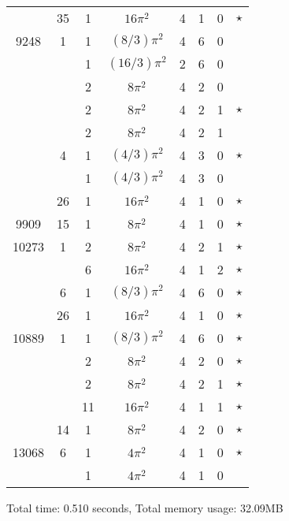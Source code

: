 \begin{tabular}{ccc|ccccc}
 & 35 & 1 & $16\pi^2$ & 4 & 1 & 0 & $\star$ \\
9248 & 1 & 1 & $(8/3)\pi^2$ & 4 & 6 & 0 &  \\
 &  & 1 & $(16/3)\pi^2$ & 2 & 6 & 0 &  \\
 &  & 2 & $8\pi^2$ & 4 & 2 & 0 &  \\
 &  & 2 & $8\pi^2$ & 4 & 2 & 1 & $\star$ \\
 &  & 2 & $8\pi^2$ & 4 & 2 & 1 &  \\
 & 4 & 1 & $(4/3)\pi^2$ & 4 & 3 & 0 & $\star$ \\
 &  & 1 & $(4/3)\pi^2$ & 4 & 3 & 0 &  \\
 & 26 & 1 & $16\pi^2$ & 4 & 1 & 0 & $\star$ \\
9909 & 15 & 1 & $8\pi^2$ & 4 & 1 & 0 & $\star$ \\
10273 & 1 & 2 & $8\pi^2$ & 4 & 2 & 1 & $\star$ \\
 &  & 6 & $16\pi^2$ & 4 & 1 & 2 & $\star$ \\
 & 6 & 1 & $(8/3)\pi^2$ & 4 & 6 & 0 & $\star$ \\
 & 26 & 1 & $16\pi^2$ & 4 & 1 & 0 & $\star$ \\
10889 & 1 & 1 & $(8/3)\pi^2$ & 4 & 6 & 0 & $\star$ \\
 &  & 2 & $8\pi^2$ & 4 & 2 & 0 & $\star$ \\
 &  & 2 & $8\pi^2$ & 4 & 2 & 1 & $\star$ \\
 &  & 11 & $16\pi^2$ & 4 & 1 & 1 & $\star$ \\
 & 14 & 1 & $8\pi^2$ & 4 & 2 & 0 & $\star$ \\
13068 & 6 & 1 & $4\pi^2$ & 4 & 1 & 0 & $\star$ \\
 &  & 1 & $4\pi^2$ & 4 & 1 & 0 &  \\
\end{tabular}
Total time: 0.510 seconds, Total memory usage: 32.09MB

